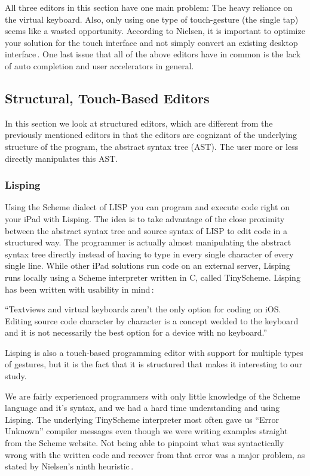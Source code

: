 All three editors in this section have one main problem: The heavy reliance on the virtual keyboard. Also, only using one type of touch-gesture (the single tap) seems like a wasted opportunity.
According to Nielsen, it is important to optimize your solution for the touch
interface and not simply convert an existing desktop interface\,\cite[p 26, p
41]{nielsen2013mobile}.
One last issue that all of the above editors have in common is the lack of auto completion and user accelerators in general.

\subsection{Structural, Touch-Based Editors}
In this section we look at structured editors, which are different from the previously mentioned editors in that the editors are cognizant of the underlying structure of the program, the abstract syntax tree (AST). The user more or less directly manipulates this AST\@.

\subsubsection{Lisping}
\label{subsub:Lisping}
Using the Scheme dialect of LISP you can program and execute code right on your iPad with Lisping. The idea is to take advantage of the close proximity between the abstract syntax tree and source syntax of LISP to edit code in a structured way. The programmer is actually almost manipulating the abstract syntax tree directly instead of having to type in every single character of every single line. While other iPad solutions run code on an external server, Lisping runs locally using a Scheme interpreter written in C, called TinyScheme. Lisping has been written with usability in mind\,\cite{lisping}: 

``Textviews and virtual keyboards aren't the only option for coding on iOS\@. Editing source code character by character is a concept wedded to the keyboard and it is not necessarily the best option for a device with no keyboard.''

Lisping is also a touch-based programming editor with support for multiple types of gestures, but it is the fact that it is structured that makes it interesting to our study.

We are fairly experienced programmers with only little knowledge of the Scheme language and it's syntax, and we had a hard time understanding and using Lisping. The underlying TinyScheme interpreter most often gave us “Error Unknown” compiler messages even though we were writing examples straight from the Scheme website. Not being able to pinpoint what was syntactically wrong with the written code and recover from that error was a major problem, as stated by Nielsen's ninth heuristic\,\cite{nielsen1990heuristic}.

